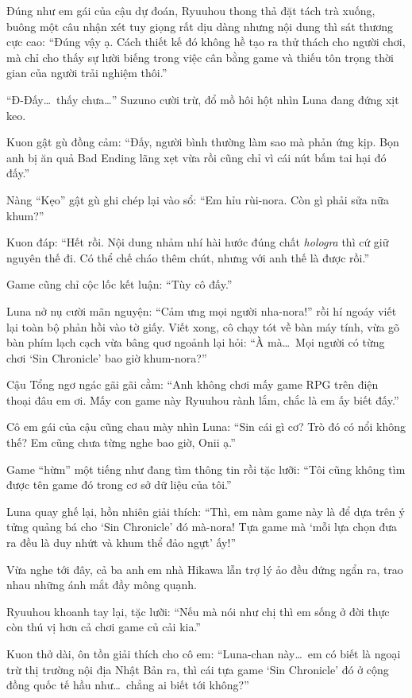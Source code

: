 \documentclass[../main.tex]{subfiles}
\begin{document}
Đúng như em gái của cậu dự đoán, Ryuuhou thong thả đặt tách trà xuống, buông một câu nhận xét tuy giọng rất dịu dàng nhưng nội dung thì sát thương cực cao: ``Đúng vậy ạ. Cách thiết kế đó không hề tạo ra thử thách cho người chơi, mà chỉ cho thấy sự lười biếng trong việc cân bằng game và thiếu tôn trọng thời gian của người trải nghiệm thôi.''

``Đ-Đấy\dots\ thấy chưa\dots'' Suzuno cười trừ, đổ mồ hôi hột nhìn Luna đang đứng xịt keo.

Kuon gật gù đồng cảm: ``Đấy, người bình thường làm sao mà phản ứng kịp. Bọn anh bị ăn quả Bad Ending lãng xẹt vừa rồi cũng chỉ vì cái nút bấm tai hại đó đấy.''

Nàng ``Kẹo'' gật gù ghi chép lại vào sổ: ``Em hỉu rùi-nora. Còn gì phải sửa nữa khum?''

Kuon đáp: ``Hết rồi. Nội dung nhảm nhí hài hước đúng chất \textit{hologra} thì cứ giữ nguyên thế đi. Có thể chế cháo thêm chút, nhưng với anh thế là được rồi.''

Game cũng chỉ cộc lốc kết luận: ``Tùy cô đấy.''

Luna nở nụ cười mãn nguyện: ``Cảm ưng mọi người nha-nora!'' rồi hí ngoáy viết lại toàn bộ phản hồi vào tờ giấy. Viết xong, cô chạy tót về bàn máy tính, vừa gõ bàn phím lạch cạch vừa bâng quơ ngoảnh lại hỏi: ``À mà\dots\ Mọi người có từng chơi `Sin Chronicle' bao giờ khum-nora?''

Cậu Tổng ngơ ngác gãi gãi cằm: ``Anh không chơi mấy game RPG trên điện thoại đâu em ơi. Mấy con game này Ryuuhou rành lắm, chắc là em ấy biết đấy.''

Cô em gái của cậu cũng chau mày nhìn Luna: ``Sin cái gì cơ? Trò đó có nổi không thế? Em cũng chưa từng nghe bao giờ, Onii ạ.''

Game ``hừm'' một tiếng như đang tìm thông tin rồi tặc lưỡi: ``Tôi cũng không tìm được tên game đó trong cơ sở dữ liệu của tôi.''

Luna quay ghế lại, hồn nhiên giải thích: ``Thì, em nàm game này là để dựa trên ý tửng quảng bá cho `Sin Chronicle' đó mà-nora! Tựa game mà `mỗi lựa chọn đưa ra đều là duy nhứt và khum thể đảo ngựt' ấy!''

Vừa nghe tới đây, cả ba anh em nhà Hikawa lẫn trợ lý ảo đều đứng ngẩn ra, trao nhau những ánh mắt đầy mông quạnh.

Ryuuhou khoanh tay lại, tặc lưỡi: ``Nếu mà nói như chị thì em sống ở đời thực còn thú vị hơn cả chơi game củ cải kia.''

Kuon thở dài, ôn tồn giải thích cho cô em: ``Luna-chan này\dots\ em có biết là ngoại trừ thị trường nội địa Nhật Bản ra, thì cái tựa game `Sin Chronicle' đó ở cộng đồng quốc tế hầu như\dots\ chẳng ai biết tới không?''
\end{document}
